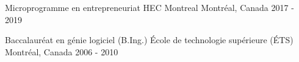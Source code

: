 
\begin{cventries}

  \cventry
    {Microprogramme en entrepreneuriat} %
    {HEC Montreal} %
    {Montréal, Canada} %
    {2017 - 2019} %
    {}

  \cventry
    {Baccalauréat en génie logiciel (B.Ing.)} %
    {École de technologie supérieure (ÉTS)} %
    {Montréal, Canada} %
    {2006 - 2010} %
    {
    }


\end{cventries}
